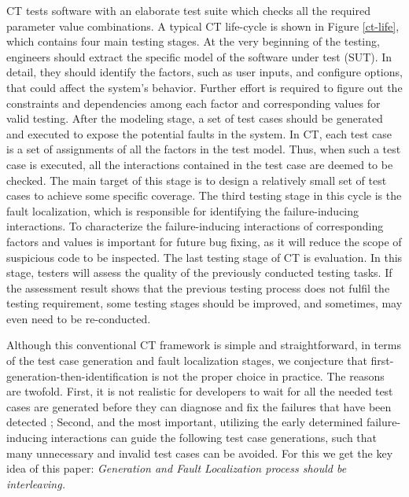 \documentclass[10pt,journal,compsoc]{IEEEtran}
\begin{document}
CT tests software with an elaborate test suite which checks all the required parameter value combinations. A typical CT life-cycle is shown in Figure \ref{ct-life}, which contains four main testing stages. At the very beginning of the testing, engineers should extract the specific model of the software under test (SUT). In detail, they should identify the factors, such as user inputs, and configure options, that could affect the system's behavior. Further effort is required to figure out the constraints and dependencies among each factor and corresponding values for valid testing. After the modeling stage, a set of test cases should be generated and executed to expose the potential faults in the system. In CT, each test case is a set of assignments of all the factors in the test model. Thus, when such a test case is executed, all the interactions contained in the test case are deemed to be checked. The main target of this stage is to design a relatively small set of test cases to achieve some specific coverage. The third testing stage in this cycle is the fault localization, which is responsible for identifying the failure-inducing interactions. To characterize the failure-inducing interactions of corresponding factors and values is important for future bug fixing, as it will reduce the scope of suspicious code to be inspected. The last testing stage of CT is evaluation. In this stage, testers will assess the quality of the previously conducted testing tasks. If the assessment result shows that the previous testing process does not fulfil the testing requirement, some testing stages should be improved, and sometimes, may even need to be re-conducted.


Although this conventional CT framework is simple and straightforward, in terms of the test case generation and fault localization stages, we conjecture that first-generation-then-identification is not the proper choice in practice. The reasons are twofold. First, it is not realistic for developers to wait for all the needed test cases are generated before they can diagnose and fix the failures that have been detected \cite{yoo2013fault}; Second, and the most important, utilizing the early determined failure-inducing interactions can guide the following test case generations, such that many unnecessary and invalid test cases can be avoided. For this we get the key idea of this paper: \emph{Generation and Fault Localization process should be interleaving.}
\end{document}
